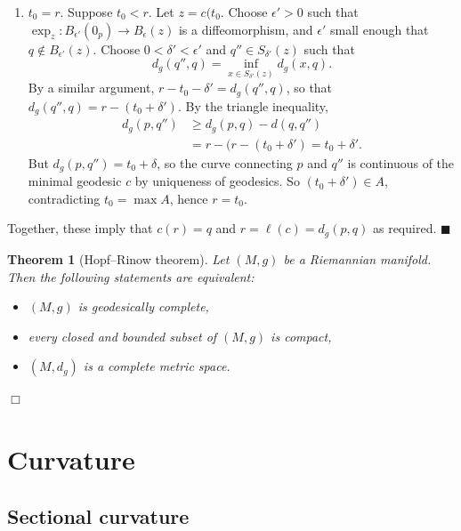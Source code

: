 \documentclass[letter-paper]{tufte-book}
\newtheorem{theorem}{\color{pastel-blue}Theorem}[section]
\newenvironment{proof}[1][Proof]{\begin{trivlist}
\item[\hskip \labelsep {\bfseries #1}]}{\end{trivlist}}
\newcommand{\qed}{\hfill$\blacksquare$}
\newcommand{\qedwhite}{\hfill \ensuremath{\Box}}
\begin{document}
\begin{proof}
\begin{enumerate}
    \item $t_0 = r$. Suppose $t_0 < r$. Let $z=c(t_0$. Choose $\epsilon' > 0$ such that $\exp_z: B_{\epsilon'}(0_p) \to B_\epsilon(z)$ is a diffeomorphism, and $\epsilon'$ small enough that $q\not\in B_{\epsilon'}(z)$. Choose $0 < \delta' < \epsilon'$ and $q'' \in S_{\delta'}(z)$ such that
    \begin{equation*}
      d_g(q'', q) = \inf_{x\in S_{\delta'}(z)}d_g(x,q).
    \end{equation*}
    By a similar argument, $r - t_0 - \delta' = d_g(q'', q)$, so that $d_g(q'',q) = r - (t_0 + \delta')$. By the triangle inequality,
    \begin{align*}
      d_g(p, q'')
        &\geq d_g(p,q) - d(q, q'')\\
        &= r - (r - (t_0 + \delta') = t_0 + \delta'.
    \end{align*}
    But $d_g(p, q'') = t_0 + \delta$, so the curve connecting $p$ and $q''$ is continuous of the minimal geodesic $c$ by uniqueness of geodesics. So $(t_0 + \delta') \in A$, contradicting $t_0 = \max A$, hence $r = t_0$.
  \end{enumerate}
  Together, these imply that $c(r) = q$ and $r=\ell(c) = d_g(p,q)$ as required. \qed
\end{proof}

\begin{theorem}[Hopf--Rinow theorem]
  Let $(M,g)$ be a Riemannian manifold. Then the following statements are equivalent:
  \begin{itemize}
    \item $(M,g)$ is geodesically complete,
    \item every closed and bounded subset of $(M,g)$ is compact,
    \item $(M, d_g)$ is a complete metric space.
  \end{itemize}
  \qedwhite
\end{theorem}


\chapter{Curvature}


\section{Sectional curvature}
\end{document}
